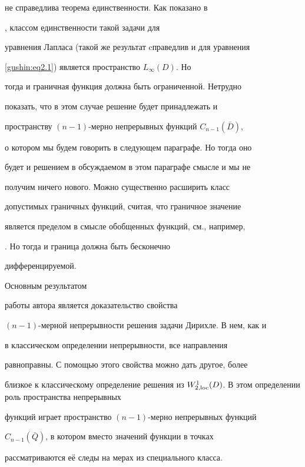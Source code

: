 не справедлива теорема единственности. Как показано в

\cite{gushin:Priv}, классом единственности такой задачи для

уравнения Лапласа (такой же результат cправедлив и для уравнения

\eqref{gushin:eq2.1}) является пространство $L_{\infty}(D)$. Но

тогда и граничная функция должна быть ограниченной. Нетрудно

показать, что в этом случае решение будет принадлежать и

пространству $(n-1)$-мерно непрерывных функций $C_{n-1}(\bar{D})$,

о котором мы будем говорить в следующем параграфе. Но тогда оно

будет и решением в обсуждаемом в этом параграфе смысле и мы не

получим ничего нового. Можно существенно расширить класс

допустимых граничных функций, считая, что граничное значение

является пределом в смысле обобщенных функций, см., например,

\cite{gushin:Seel}. Но тогда и граница должна быть бесконечно

дифференцируемой.



\smallskip



 Основным результатом

работы автора \cite{gushin:G88} является доказательство свойства

$(n-1)$-мерной непрерывности решения задачи Дирихле. В нем, как и

в классическом определении непрерывности, все направления

равноправны. С помощью этого свойства можно дать другое, более

близкое к классическому определение решения из $ W_{2,{\rm

loc}}^1(D)$. В этом определении роль пространства непрерывных

функций играет пространство $(n-1)$-мерно непрерывных функций

$C_{n-1}(\bar{Q})$, в котором вместо значений функции в точках

рассматриваются её следы на мерах из специального класса.



